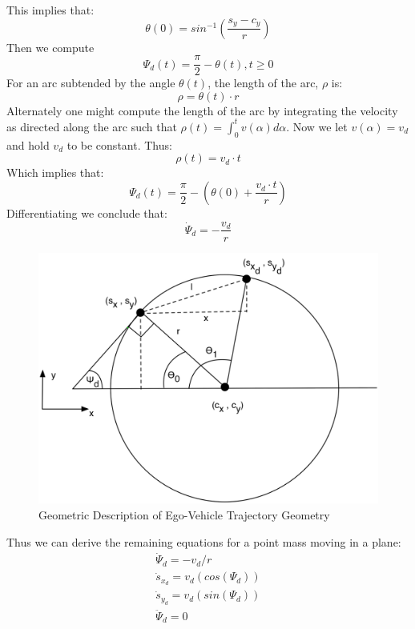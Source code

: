 This implies that:
\begin{equation}
	\theta(0) = sin^{-1} \left(\frac{s_y-c_y}{r}\right)
\end{equation}
Then we compute 
\begin{equation}
\Psi_d(t) =  \frac{\pi}{2}-\theta(t), t \geq 0
\end{equation}
For an arc subtended by the angle $\theta(t)$, the length of the arc, $\rho$ is:
\begin{equation}
	\rho = \theta(t) \cdotp r
\end{equation}
Alternately one might compute the length of the arc by integrating the velocity as directed along the arc such that $\rho(t) = \int_{0}^{t}v(\alpha) d\alpha$. Now we let $v(\alpha) = v_d$ and hold $v_d$ to be constant. Thus:
\begin{equation}
	\rho(t) = v_d \cdotp t
\end{equation}
Which implies that:
\begin{equation}
	\Psi_d(t) = \frac{\pi}{2} - \left( \theta(0) + \frac{v_d \cdotp t}{r}\right)
\end{equation}
Differentiating we conclude that:
\begin{equation}
	\dot{\Psi}_d = -\frac{v_d}{r}
\end{equation}
\begin{figure}
	\centering
	\includegraphics[scale=0.5]{figures/traj-track-diagram}
	\caption{Geometric Description of Ego-Vehicle Trajectory Geometry}
\end{figure}

\noindent Thus we can derive the remaining equations for a point mass moving in a plane:
\begin{gather}
 \dot{\Psi}_d= -v_d/r\\
 \dot{s}_{x_d} = v_d \left(cos(\Psi_d)\right)\\
 \dot{s}_{y_d} = v_d \left(sin(\Psi_d) \right)\\
 \ddot{\Psi}_d = 0
\end{gather}
